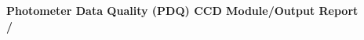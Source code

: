 \documentclass[letterpaper]{article}
\begin{document}
\begin{titlepage}
  

  \begin{center}
    {\Huge {\bf Photometer Data Quality (PDQ) CCD Module/Output
        Report}}\\[5ex]
    {\huge {\bf \ccdModule/\ccdOutput}}
  \end{center}

  
\end{titlepage}

\clearpage
{}
\setcounter{page}{2}
\tableofcontents

\clearpage
{}
\setcounter{page}{1}




\end{document}
